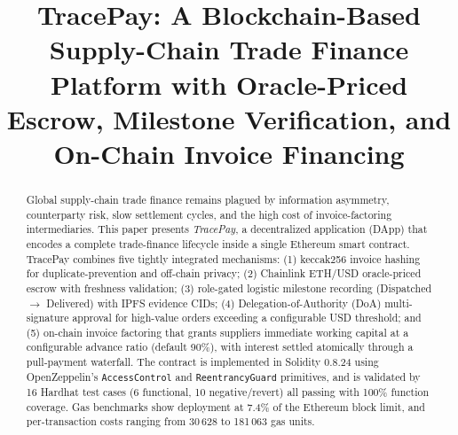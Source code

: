 \documentclass[conference]{IEEEtran}
\begin{document}
\title{TracePay: A Blockchain-Based Supply-Chain Trade Finance Platform
       with Oracle-Priced Escrow, Milestone Verification,
       and On-Chain Invoice Financing}

\author{
  \and
  \and
}

\maketitle

\begin{abstract}
Global supply-chain trade finance remains plagued by information
asymmetry, counterparty risk, slow settlement cycles, and the high
cost of invoice-factoring intermediaries.
This paper presents \textit{TracePay}, a decentralized application
(DApp) that encodes a complete trade-finance lifecycle inside a single
Ethereum smart contract.
TracePay combines five tightly integrated mechanisms:
(1) keccak256 invoice hashing for duplicate-prevention and
off-chain privacy;
(2) Chainlink ETH/USD oracle-priced escrow with freshness validation;
(3) role-gated logistic milestone recording (Dispatched
$\rightarrow$ Delivered) with IPFS evidence CIDs;
(4) Delegation-of-Authority (DoA) multi-signature approval for
high-value orders exceeding a configurable USD threshold; and
(5) on-chain invoice factoring that grants suppliers immediate
working capital at a configurable advance ratio (default 90\%),
with interest settled atomically through a pull-payment waterfall.
The contract is implemented in Solidity 0.8.24 using
OpenZeppelin's \texttt{AccessControl} and \texttt{ReentrancyGuard}
primitives, and is validated by 16 Hardhat test cases (6 functional,
10 negative/revert) all passing with 100\% function coverage.
Gas benchmarks show deployment at 7.4\% of the Ethereum block limit,
and per-transaction costs ranging from 30\,628 to 181\,063 gas units.
\end{abstract}
\end{document}
